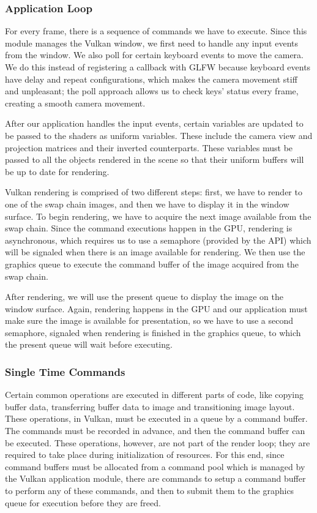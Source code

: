 \subsubsection{Application Loop}
For every frame, there is a sequence of commands we have to execute. Since this module manages the Vulkan window, we first need to handle any input events from the window. We also poll for certain keyboard events to move the camera. We do this instead of registering a callback with GLFW because keyboard events have delay and repeat configurations, which makes the camera movement stiff and unpleasant; the poll approach allows us to check keys' status every frame, creating a smooth camera movement.

After our application handles the input events, certain variables are updated to be passed to the shaders as uniform variables. These include the camera view and projection matrices and their inverted counterparts. These variables must be passed to all the objects rendered in the scene so that their uniform buffers will be up to date for rendering.

Vulkan rendering is comprised of two different steps: first, we have to render to one of the swap chain images, and then we have to display it in the window surface. To begin rendering, we have to acquire the next image available from the swap chain. Since the command executions happen in the GPU, rendering is asynchronous, which requires us to use a semaphore (provided by the API) which will be signaled when there is an image available for rendering. We then use the graphics queue to execute the command buffer of the image acquired from the swap chain.

After rendering, we will use the present queue to display the image on the window surface. Again, rendering happens in the GPU and our application must make sure the image is available for presentation, so we have to use a second semaphore, signaled when rendering is finished in the graphics queue, to which the present queue will wait before executing.

\subsubsection{Single Time Commands}
Certain common operations are executed in different parts of code, like copying buffer data, transferring buffer data to image and transitioning image layout. These operations, in Vulkan, must be executed in a queue by a command buffer. The commands must be recorded in advance, and then the command buffer can be executed. These operations, however, are not part of the render loop; they are required to take place during initialization of resources. For this end, since command buffers must be allocated from a command pool which is managed by the Vulkan application module, there are commands to setup a command buffer to perform any of these commands, and then to submit them to the graphics queue for execution before they are freed.

